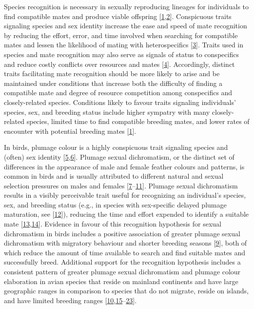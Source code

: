 \documentclass[
  a4paper,
]{article}
\begin{document}
Species recognition is necessary in sexually reproducing lineages for
individuals to find compatible mates and produce viable offspring
{[}\protect\hyperlink{ref-andersson1994}{1},\protect\hyperlink{ref-groning2008}{2}{]}.
Conspicuous traits signaling species and sex identity increase the ease
and speed of mate recognition by reducing the effort, error, and time
involved when searching for compatible mates and lessen the likelihood
of mating with heterospecifics
{[}\protect\hyperlink{ref-pfennig2012}{3}{]}. Traits used in species and
mate recognition may also serve as signals of status to conspecifics and
reduce costly conflicts over resources and mates
{[}\protect\hyperlink{ref-west-eberhard1983}{4}{]}. Accordingly,
distinct traits facilitating mate recognition should be more likely to
arise and be maintained under conditions that increase both the
difficulty of finding a compatible mate and degree of resource
competition among conspecifics and closely-related species. Conditions
likely to favour traits signaling individuals' species, sex, and
breeding status include higher sympatry with many closely-related
species, limited time to find compatible breeding mates, and lower rates
of encounter with potential breeding mates
{[}\protect\hyperlink{ref-andersson1994}{1}{]}.

In birds, plumage colour is a highly conspicuous trait signaling species
and (often) sex identity
{[}\protect\hyperlink{ref-martin2015a}{5},\protect\hyperlink{ref-bitton2016}{6}{]}.
Plumage sexual dichromatism, or the distinct set of differences in the
appearance of male and female feather colours and patterns, is common in
birds and is usually attributed to different natural and sexual
selection pressures on males and females
{[}\protect\hyperlink{ref-martin1996}{7}--\protect\hyperlink{ref-dunn2015}{11}{]}.
Plumage sexual dichromatism results in a visibly perceivable trait
useful for recognizing an individual's species, sex, and breeding status
(e.g., in species with sex-specific delayed plumage maturation, see
{[}\protect\hyperlink{ref-hawkins2012}{12}{]}), reducing the time and
effort expended to identify a suitable mate
{[}\protect\hyperlink{ref-hamilton1961}{13},\protect\hyperlink{ref-saetre1992}{14}{]}.
Evidence in favour of this recognition hypothesis for sexual
dichromatism in birds includes a positive association of greater plumage
sexual dichromatism with migratory behaviour and shorter breeding
seasons {[}\protect\hyperlink{ref-badyaev2003}{9}{]}, both of which
reduce the amount of time available to search and find suitable mates
and successfully breed. Additional support for the recognition
hypothesis includes a consistent pattern of greater plumage sexual
dichromatism and plumage colour elaboration in avian species that reside
on mainland continents and have large geographic ranges in comparison to
species that do not migrate, reside on islands, and have limited
breeding ranges
{[}\protect\hyperlink{ref-dale2015}{10},\protect\hyperlink{ref-friedman2009}{15}--\protect\hyperlink{ref-kearns2020}{23}{]}.
\end{document}
